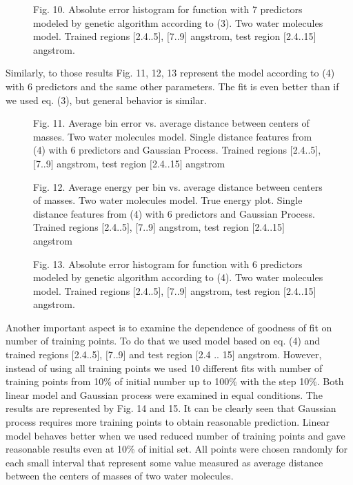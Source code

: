 \documentclass[aps,prl,reprint,amsmath,amssymb,nature]{revtex4-1}
\begin{document}
\begin{figure}[h]
\centering
\caption{Fig. 10. Absolute error histogram for function with 7 
predictors modeled by genetic algorithm according to (3). Two water 
molecules model. Trained regions $[$2.4..5$]$, $[$7..9$]$ angstrom, test 
region $[$2.4..15$]$ angstrom.}
\end{figure}

Similarly, to those results Fig. 11, 12, 13 represent the model 
according to (4) with 6 predictors and the same other parameters. The 
fit is even better than if we used eq. (3), but general behavior is 
similar.

\begin{figure}[h]
\centering
\caption{Fig. 11. Average bin error vs. average distance between centers 
of masses. Two water molecules model. Single distance features from (4) 
with 6 predictors and Gaussian Process. Trained regions $[$2.4..5$]$, 
$[$7..9$]$ angstrom, test region $[$2.4..15$]$ angstrom}
\end{figure}

\begin{figure}[h]
\centering
\caption{Fig. 12. Average energy per bin vs. average distance between 
centers of masses. Two water molecules model. True energy plot. Single 
distance features from (4) with 6 predictors and Gaussian Process. 
Trained regions $[$2.4..5$]$, $[$7..9$]$ angstrom, test region 
$[$2.4..15$]$ angstrom}
\end{figure}


\begin{figure}[h]
\centering
\caption{Fig. 13. Absolute error histogram for function with 6 
predictors modeled by genetic algorithm according to (4). Two water 
molecules model. Trained regions $[$2.4..5$]$, $[$7..9$]$ angstrom, test 
region $[$2.4..15$]$ angstrom.}
\end{figure}

Another important aspect is to examine the dependence of goodness of fit 
on number of training points. To do that we used model based on eq. (4) 
and trained regions $[$2.4..5$]$, $[$7..9$]$ and test region $[$2.4 .. 
15$]$ angstrom. However, instead of using all training points we used 10 
different fits with number of training points from 10\% of initial 
number up to 100\% with the step 10\%. Both linear model and Gaussian 
process were examined in equal conditions. The results are represented 
by Fig. 14 and 15. It can be clearly seen that Gaussian process requires 
more training points to obtain reasonable prediction. Linear model 
behaves better when we used reduced number of training points and gave 
reasonable results even at 10\% of initial set. All points were chosen 
randomly for each small interval that represent some value measured as 
average distance between the centers of masses of two water molecules. 
\end{document}
